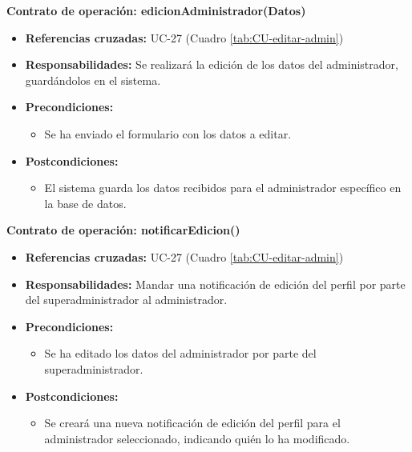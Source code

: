 \textbf{Contrato de operación: edicionAdministrador(Datos)}
\begin{itemize}
\item \textbf{Referencias cruzadas:} UC-27 (Cuadro \ref{tab:CU-editar-admin})
\item \textbf{Responsabilidades:} Se realizará la edición de los datos del administrador, guardándolos en el sistema.
\item \textbf{Precondiciones:} 
 \begin{itemize}
\item Se ha enviado el formulario con los datos a editar.
\end {itemize}
\item \textbf{Postcondiciones:} 
 \begin{itemize}
\item El sistema guarda los datos recibidos para el administrador específico en la base de datos.
\end {itemize}
\end {itemize}

\textbf{Contrato de operación: notificarEdicion()}
\begin{itemize}
\item \textbf{Referencias cruzadas:} UC-27 (Cuadro \ref{tab:CU-editar-admin})
\item \textbf{Responsabilidades:} Mandar una notificación de edición del perfil por parte del superadministrador al administrador.
\item \textbf{Precondiciones:} 
 \begin{itemize}
\item Se ha editado los datos del administrador por parte del superadministrador.
\end {itemize}
\item \textbf{Postcondiciones:} 
 \begin{itemize}
\item Se creará una nueva notificación de edición del perfil para el administrador seleccionado, indicando quién lo ha modificado.
\end {itemize}
\end {itemize}

